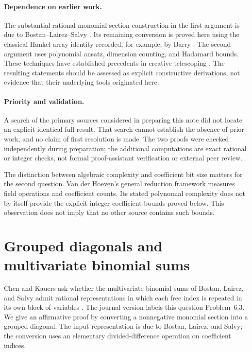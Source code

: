 \documentclass[11pt,a4paper]{article}
\theoremstyle{remark}\newtheorem{remark}[theorem]{Remark}
\begin{document}
\paragraph{Dependence on earlier work.}
The substantial rational monomial-section construction in the first
argument is due to Bostan--Lairez--Salvy \cite{BLS2017}. Its remaining
conversion is proved here using the classical Hankel-array identity
recorded, for example, by Barry \cite[p.~5]{Barry2016}.
The second argument uses polynomial ansatz, dimension counting, and
Hadamard bounds. These techniques have established precedents in
creative telescoping \cite{CK2012,KY2015}.
The resulting statements should be assessed as explicit constructive
derivations, not evidence that their underlying tools originated here.

\paragraph{Priority and validation.}
A search of the primary sources considered in preparing this note did
not locate an explicit identical full result. That search cannot establish
the absence of prior work, and no claim of first resolution is made.
The two proofs were checked independently during preparation; the
additional computations are exact rational or integer checks, not formal
proof-assistant verification or external peer review.

The distinction between algebraic complexity and coefficient bit size
matters for the second question. Van der Hoeven's general reduction
framework \cite[Section~8.1 and Theorem~9.8]{vdH2018} measures field
operations and coefficient counts. Its stated polynomial complexity does
not by itself provide the explicit integer coefficient bounds proved below.
This observation does not imply that no other source contains such bounds.

\section{Grouped diagonals and multivariate binomial sums}
\label{sec:gd}

Chen and Kauers ask whether the multivariate binomial sums of
Bostan, Lairez, and Salvy admit rational representations in which each free
index is repeated in its own block of variables
\cite[Problem~12]{CK2016}.  The journal version labels this question
Problem~6.3.  We give an affirmative proof by converting a nonnegative
monomial section into a grouped diagonal.  The input representation is due
to Bostan, Lairez, and Salvy; the conversion uses an elementary
divided-difference operation on coefficient indices.
\end{document}
